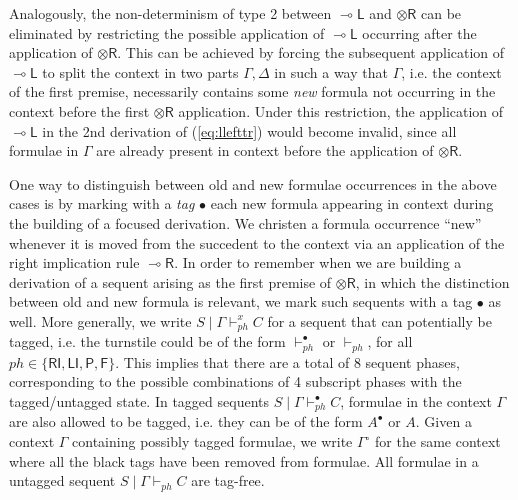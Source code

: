 \documentclass[submission,copyright,creativecommons]{eptcs}
\theoremstyle{definition}
\newcommand{\tr}{\otimes \mathsf{R}}
\newcommand{\lright}{{\multimap}\mathsf{R}}
\newcommand{\lleft}{{\multimap}\mathsf{L}}
\newcommand{\RI}{\mathsf{RI}}
\newcommand{\LI}{\mathsf{LI}}
\newcommand{\Pass}{\mathsf{P}}
\newcommand{\F}{\mathsf{F}}
\newcommand{\xvdash}{\vdash^{x}}
\begin{document}
Analogously, the non-determinism of type 2 between $\lleft$ and $\tr$ can be eliminated by restricting the possible application of $\lleft$ occurring after the application of $\tr$. This can be achieved by forcing the subsequent  application of $\lleft$ to split the context in two parts $\Gamma,\Delta$ in such a way that $\Gamma$, i.e. the context of the first premise, necessarily contains some \emph{new} formula not occurring in the context before the first $\tr$ application. Under this restriction, the application of $\lleft$ in the 2nd derivation of (\ref{eq:llefttr}) would become invalid, since all formulae in $\Gamma$ are already present in context before the application of $\tr$.

One way to distinguish between old and new formulae occurrences in the above cases is by marking with a \emph{tag} $\bullet$ each new formula appearing in context during the building of a focused derivation. We christen a formula occurrence ``new'' whenever it is moved from the succedent to the context via an application of the right implication rule $\lright$. In order to remember when we are building a derivation of a sequent arising as the first premise of $\tr$, in which the distinction between old and new formula is relevant, we mark such sequents with a tag $\bullet$ as well.
More generally, we write $S \mid \Gamma \xvdash_{ph} C$ for a sequent that can potentially be tagged, i.e. the turnstile could be of the form $\vdash_{ph}^{\bullet}$ or $\vdash_{ph}$, for all $ph \in \{ \RI,\LI,\Pass,\F\}$. This implies that there are a total of 8 sequent phases, corresponding to the possible combinations of 4 subscript phases with the tagged/untagged state.
In tagged sequents  $S \mid \Gamma \vdash_{ph}^{\bullet} C$, formulae in the context $\Gamma$ are also allowed to be tagged, i.e. they can be of the form $A^\bullet$ or $A$. Given a context $\Gamma$ containing possibly tagged formulae, we write $\Gamma^{\circ}$ for the same context where all the black tags have been removed from formulae. All formulae in a untagged sequent $S \mid \Gamma \vdash_{ph} C$ are tag-free.
\end{document}
